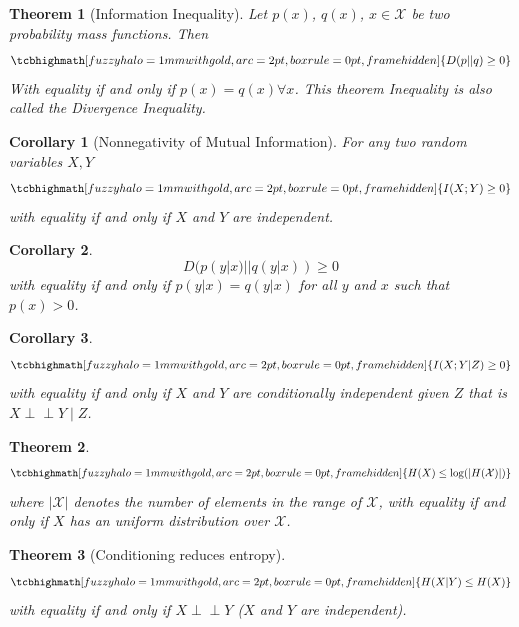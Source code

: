 \documentclass[a4paper,10pt]{article}
\newtheorem{theorem}{Theorem}
\newtheorem{corollary}{Corollary}
\newcommand{\equationgold}[1]{
  \tcbhighmath[fuzzy halo=1mm with gold,arc=2pt,boxrule=0pt,frame hidden]{#1}
}
\newcommand{\hlt}[1]{\colorbox{color3}{#1}}
\begin{document}
\begin{theorem}[Information Inequality]
    Let $p(x)$, $q(x)$, $x \in \mathcal{X}$ be two probability mass functions. Then
    \begin{equation}
        \equationgold{
            D(p || q) \geq 0
        }
    \end{equation}
    With equality if and only if $p(x) = q(x) \forall x$. This theorem Inequality is also called the \hlt{Divergence Inequality}.
\end{theorem}

\begin{corollary}[Nonnegativity of Mutual Information]
    For any two random variables $X, Y$
    \begin{equation}
        \equationgold{
            I(X; Y) \geq 0
        }
    \end{equation}
    with equality if and only if $X$ and $Y$ are independent.
\end{corollary}

\begin{corollary}
    \begin{equation}        
        D(p(y|x) || q(y|x)) \geq 0
    \end{equation}
    with equality if and only if $p(y|x) = q(y|x)$ for all $y$ and $x$ such that $p(x) > 0$.
\end{corollary}

\begin{corollary}
    \begin{equation}
        \equationgold{
            I(X; Y | Z) \geq 0
        }
    \end{equation}
    with equality if and only if $X$ and $Y$ are conditionally independent given $Z$ that is $X \perp\!\!\!\perp Y \mid Z$.
\end{corollary}

\begin{theorem}
    \begin{equation}
        \equationgold{
            H(X) \leq \log(|H(\mathcal{X})|)
        }
    \end{equation}
    where $|\mathcal{X}|$ denotes the number of elements in the range of $\mathcal{X}$, with equality if and only if $X$  has an uniform distribution over $\mathcal{X}$.
\end{theorem}

\begin{theorem}[Conditioning reduces entropy]
    \begin{equation}
        \equationgold{
            H(X|Y) \leq H(X)
        }
    \end{equation}
    with equality if and only if $X \perp\!\!\!\perp Y$ ($X$ and $Y$ are independent).
\end{theorem}
\end{document}
